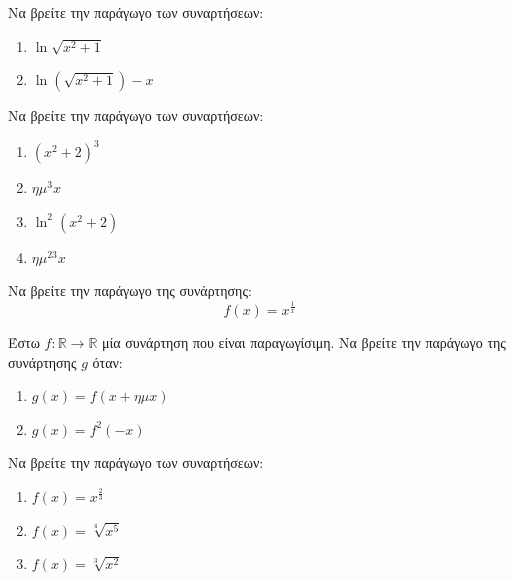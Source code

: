 \documentclass{presentation}
\begin{document}
\begin{askisi}
  Να βρείτε την παράγωγο των συναρτήσεων:
  \begin{enumerate}
    \item<1-> $\ln \sqrt{x^2+1}$
    \item<2-> $\ln(\sqrt{x^2+1})-x$
  \end{enumerate}

\end{askisi}

\begin{askisi}
  Να βρείτε την παράγωγο των συναρτήσεων:
  \begin{enumerate}
    \item<1-> $(x^2+2)^3$
    \item<2-> $ημ^3x$
    \item<3-> $\ln^2(x^2+2)$
    \item<4-> $ημ^23x$
  \end{enumerate}

\end{askisi}

\begin{askisi}
  Να βρείτε την παράγωγο της συνάρτησης:
  $$f(x)=x^{\frac{1}{x}}$$

\end{askisi}

\begin{askisi}
  Έστω $f:\mathbb{R}\to\mathbb{R}$ μία συνάρτηση που είναι παραγωγίσιμη. Να βρείτε την παράγωγο της συνάρτησης $g$ όταν:
  \begin{enumerate}
    \item<1-> $g(x)=f(x+ημx)$
    \item<2-> $g(x)=f^2(-x)$
  \end{enumerate}

\end{askisi}

\begin{askisi}
  Να βρείτε την παράγωγο των συναρτήσεων:
  \begin{enumerate}
    \item<1-> $f(x)=x^{\frac{2}{3}}$
    \item<2-> $f(x)=\sqrt[4]{x^5}$
    \item<3-> $f(x)=\sqrt[3]{x^2}$
  \end{enumerate}

\end{askisi}
\end{document}
